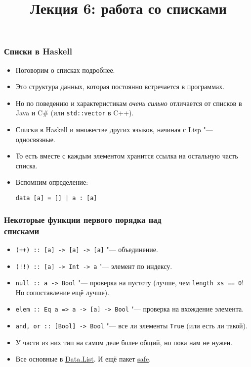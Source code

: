 \documentclass[11pt]{beamer}
\title{Лекция 6: работа со списками}
\begin{document}
\begin{frame}[plain]
\maketitle
\end{frame}

\begin{frame}[fragile]
\frametitle{Списки в Haskell}
\begin{itemize}
    \item Поговорим о списках подробнее.
    \item Это структура данных, которая постоянно встречается в программах.
    \item Но по поведению и характеристикам \emph{очень сильно} отличается от списков в Java и C\# (или \lstinline|std::vector| в C++).
    \pause
    \item Списки в Haskell и множестве других языков, начиная с Lisp "--- односвязные.
    \pause
    \item То есть вместе с каждым элементом хранится ссылка на остальную часть списка.
    \item Вспомним определение:
\begin{lstlisting}
data [a] = [] | a : [a]
\end{lstlisting}
\end{itemize}
\end{frame}

\begin{frame}[fragile]
\frametitle{Некоторые функции первого порядка над\\ списками}
\begin{itemize}
    \item \lstinline|(++) :: [a] -> [a] -> [a]| \pause"--- объединение.
    \item \lstinline|(!!) :: [a] -> Int -> a| \pause"--- элемент по индексу.
    \item \lstinline|null :: a -> Bool| \pause"--- проверка на пустоту (лучше, чем \lstinline|length xs == 0|! Но сопоставление ещё лучше).
    \item \lstinline|elem :: Eq a => a -> [a] -> Bool| \pause"--- проверка на вхождение элемента.
    \item \lstinline|and, or :: [Bool] -> Bool| \pause"--- все ли элементы \lstinline|True| (или есть ли такой).
    \pause
    \item У части из них тип на самом деле более общий, но пока нам не нужен.
    \pause
    \item Все основные в \href{https://hackage.haskell.org/package/base-4.12.0.0/docs/Data-List.html}{Data.List}. \pause И ещё пакет \href{http://hackage.haskell.org/package/safe}{safe}.
\end{itemize}
\end{frame}
\end{document}
